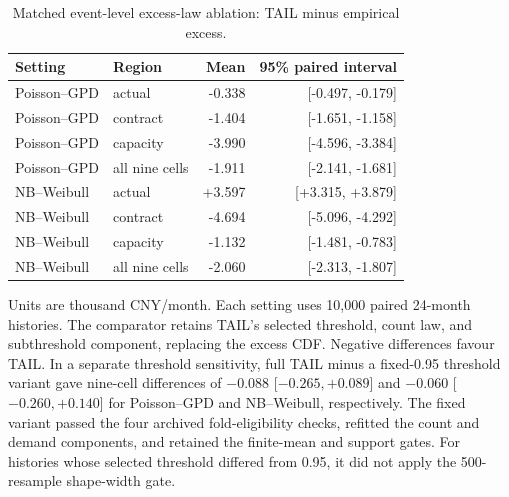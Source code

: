 \begin{table}[tbp]\centering\small
\caption{Matched event-level excess-law ablation: TAIL minus empirical excess.}\label{tab:tail-excess-ablation}
\begin{tabular}{@{}llrr@{}}\toprule Setting & Region & Mean & 95\% paired interval\\\midrule
Poisson--GPD & actual & -0.338 & [-0.497, -0.179]\\
Poisson--GPD & contract & -1.404 & [-1.651, -1.158]\\
Poisson--GPD & capacity & -3.990 & [-4.596, -3.384]\\
Poisson--GPD & all nine cells & -1.911 & [-2.141, -1.681]\\
NB--Weibull & actual & +3.597 & [+3.315, +3.879]\\
NB--Weibull & contract & -4.694 & [-5.096, -4.292]\\
NB--Weibull & capacity & -1.132 & [-1.481, -0.783]\\
NB--Weibull & all nine cells & -2.060 & [-2.313, -1.807]\\
\bottomrule\end{tabular}\par\smallskip\footnotesize Units are thousand CNY/month. Each setting uses 10,000 paired 24-month histories. The comparator retains TAIL's selected threshold, count law, and subthreshold component, replacing the excess CDF. Negative differences favour TAIL. In a separate threshold sensitivity, full TAIL minus a fixed-0.95 threshold variant gave nine-cell differences of $-0.088$ [$-0.265,+0.089$] and $-0.060$ [$-0.260,+0.140$] for Poisson--GPD and NB--Weibull, respectively. The fixed variant passed the four archived fold-eligibility checks, refitted the count and demand components, and retained the finite-mean and support gates. For histories whose selected threshold differed from 0.95, it did not apply the 500-resample shape-width gate.\end{table}
